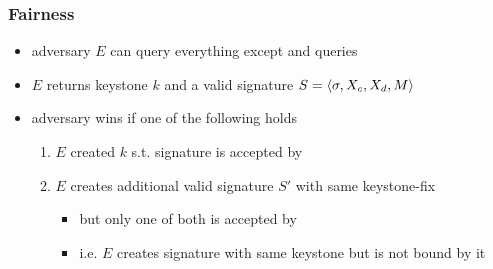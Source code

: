 \begin{frame}
	\frametitle{Fairness}

	\begin{itemize}[<+->]
    \setlength\itemsep{1em}
    \item adversary $E$ can query everything except \averify and \verify queries
		\item $E$ returns keystone $k$ and a \textcolor{BurntOrange}{valid} signature $S = \langle \sigma, X_c, X_d, M \rangle$
		\item adversary wins if one of the following holds
      \begin{enumerate}[(1.)]
        \setlength\itemsep{.75em}  
				\item $E$ created $k$ s.t. signature is accepted by \verify
				\item $E$ creates additional \textcolor{BurntOrange}{valid} signature $S'$ with same keystone-fix
          \begin{itemize}
            \item but only one of both is accepted by \verify
            \item i.e. $E$ creates signature with same keystone but is not bound by it
          \end{itemize}
			\end{enumerate}
	\end{itemize}
\end{frame}